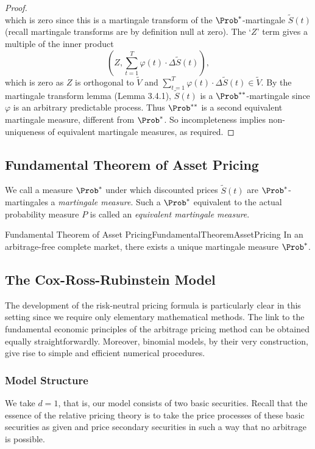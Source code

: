 \begin{proof}
\[	\]
	which is zero since this is a martingale transform of the \(\Prob^*\)-martingale \(\tilde{S}(t)\) (recall martingale transforms are by definition null at zero). The `\(Z\)' term gives a multiple of the inner product
	\[
		\left(Z, \sum_{t=1}^T \varphi(t) \cdot \Delta \tilde{S}(t)\right),
	\]
	which is zero as \(Z\) is orthogonal to \(\tilde{V}\) and \(\sum_{t=1}^T \varphi(t) \cdot \Delta \tilde{S}(t) \in \tilde{V}\). By the martingale transform lemma (Lemma 3.4.1), \(\tilde{S}(t)\) is a \(\Prob^{**}\)-martingale since \(\varphi\) is an arbitrary predictable process. Thus \(\Prob^{**}\) is a second equivalent martingale measure, different from \(\Prob^*\). So incompleteness implies non-uniqueness of equivalent martingale measures, as required.
\end{proof}

\subsection{Fundamental Theorem of Asset Pricing}

We call a measure \(\Prob^*\) under which discounted prices \(\tilde{S}(t)\) are \(\Prob^*\)-martingales a \textit{martingale measure}. Such a \(\Prob^*\) equivalent to the actual probability measure \(P\) is called an \textit{equivalent martingale measure}.

\begin{thm}{Fundamental Theorem of Asset Pricing}{FundamentalTheoremAssetPricing}
	In an arbitrage-free complete market, there exists a unique martingale measure \(\Prob^*\).
\end{thm}

\subsection{The Cox-Ross-Rubinstein Model}
The development of the risk-neutral pricing formula is particularly clear in this setting since we require only elementary mathematical methods. The link to the fundamental economic principles of the arbitrage pricing method can be obtained equally straightforwardly. Moreover, binomial models, by their very construction, give rise to simple and efficient numerical procedures.

\subsubsection{Model Structure}
We take \(d=1\), that is, our model consists of two basic securities. Recall that the essence of the relative pricing theory is to take the price processes of these basic securities as given and price secondary securities in such a way that no arbitrage is possible.

